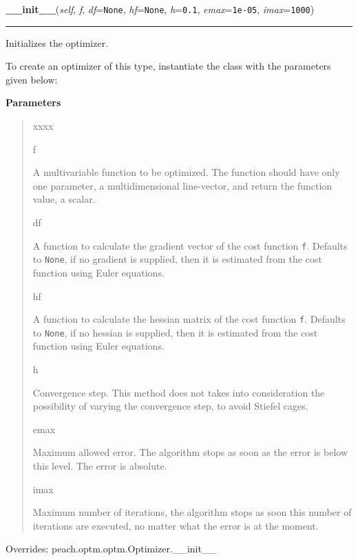     \begin{boxedminipage}{\textwidth}

    \raggedright \textbf{\_\_init\_\_}(\textit{self}, \textit{f}, \textit{df}=\texttt{None}, \textit{hf}=\texttt{None}, \textit{h}=\texttt{0.1}, \textit{emax}=\texttt{1e-05}, \textit{imax}=\texttt{1000})

    \vspace{-1.5ex}

    \rule{\textwidth}{0.5\fboxrule}

Initializes the optimizer.

To create an optimizer of this type, instantiate the class with the
parameters given below:
    \vspace{1ex}

      \textbf{Parameters}
      \begin{quote}
        \begin{Ventry}{xxxx}

          \item[f]


A multivariable function to be optimized. The function should have
only one parameter, a multidimensional line-vector, and return the
function value, a scalar.
          \item[df]


A function to calculate the gradient vector of the cost function
\texttt{f}. Defaults to \texttt{None}, if no gradient is supplied, then it is
estimated from the cost function using Euler equations.
          \item[hf]


A function to calculate the hessian matrix of the cost function
\texttt{f}. Defaults to \texttt{None}, if no hessian is supplied, then it is
estimated from the cost function using Euler equations.
          \item[h]


Convergence step. This method does not takes into consideration the
possibility of varying the convergence step, to avoid Stiefel cages.
          \item[emax]


Maximum allowed error. The algorithm stops as soon as the error is
below this level. The error is absolute.
          \item[imax]


Maximum number of iterations, the algorithm stops as soon this
number of iterations are executed, no matter what the error is at
the moment.
        \end{Ventry}

      \end{quote}

    \vspace{1ex}

      Overrides: peach.optm.optm.Optimizer.\_\_init\_\_

    \end{boxedminipage}

